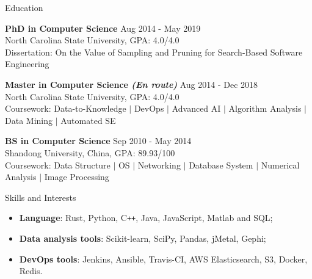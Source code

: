 \documentclass{resume} %
\newenvironment{myitemize}
{ \begin{itemize}[leftmargin=0.2em,label={}]
    \setlength{\itemsep}{0pt}
    \setlength{\parskip}{0pt}
    \setlength{\parsep}{0pt}     }
{ \end{itemize}                  }
\begin{document}
\begin{rSection}{Education}

{\bf PhD in Computer Science} \hfill {Aug 2014 - May 2019}\\ 
North Carolina State University, GPA: 4.0/4.0  \\
Dissertation: On the Value of Sampling and Pruning for Search-Based Software Engineering

{\bf Master in Computer Science {\it (En route)}} \hfill {Aug 2014 - Dec 2018}\\ 
North Carolina State University, GPA: 4.0/4.0  \\
Coursework: Data-to-Knowledge $|$ DevOps $|$ Advanced AI $|$ Algorithm Analysis $|$ Data Mining $|$ Automated SE

{\bf BS in Computer Science} \hfill {Sep 2010 - May 2014}\\ 
Shandong University, China, GPA: 89.93/100  \\
Coursework: Data Structure $|$ OS $|$ Networking $|$ Database System $|$ Numerical Analysis $|$ Image Processing

\end{rSection} 


\begin{rSection}{Skills and Interests}
\begin{myitemize}\setlength\itemsep{0.1em}
    \item \textbf{Language}: Rust, Python, C\texttt{++}, Java, JavaScript, Matlab and SQL;
    \item \textbf{Data analysis tools}: Scikit-learn, SciPy, Pandas, jMetal, Gephi;
    \item \textbf{DevOps tools}: Jenkins, Ansible, Travis-CI, AWS Elasticsearch, S3, Docker, Redis.
\end{myitemize}


\end{rSection}
\end{document}
